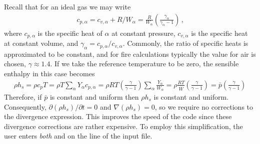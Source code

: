Recall that for an ideal gas we may write
\begin{align}
c_{p,\alpha} = c_{v,\alpha} + R/W_\alpha = \frac{R}{W_\alpha} \left(\frac{\gamma_\alpha}{\gamma_\alpha-1}\right) \,\mbox{,}
\end{align}
where $c_{p,\alpha}$ is the specific heat of $\alpha$ at constant pressure, $c_{v,\alpha}$ is the specific heat at constant volume, and $\gamma_\alpha = c_{p,\alpha}/c_{v,\alpha}$.  Commonly, the ratio of specific heats is approximated to be constant, and for fire calculations typically the value for air is chosen, $\gamma \approx 1.4$.  If we take the reference temperature to be zero, the sensible enthalpy in this case becomes
\begin{align}
\rho h_s = \rho c_p T = \rho T \sum_\alpha Y_\alpha c_{p,\alpha} = \rho R T \left(\frac{\gamma}{\gamma-1}\right)\sum_\alpha \frac{Y_\alpha}{W_\alpha} = \rho \frac{R T}{\overline{W}} \left(\frac{\gamma}{\gamma-1}\right) = \bar{p}\left(\frac{\gamma}{\gamma-1}\right)
\end{align}
Therefore, if $\bar{p}$ is constant and uniform then $\rho h_s$ is constant and uniform.  Consequently, $\partial (\rho h_s)/\partial t = 0$ and $\nabla (\rho h_s) = 0$, so we require no corrections to the divergence expression.  This improves the speed of the code since these divergence corrections are rather expensive.  To employ this simplification, the user enters \emph{both}  and  on the  line of the input file.


